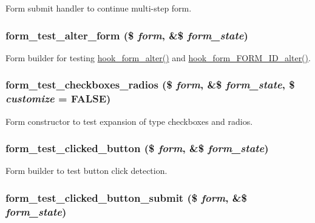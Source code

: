 \label{form__test_8module_a14e1121d5bdf2a79e3547f4d30d410b7}
Form submit handler to continue multi-\/step form. \hypertarget{form__test_8module_a8f29d88f476cd4a4d7770cb83f5b9e5e}{
\subsubsection[{form\_\-test\_\-alter\_\-form}]{\setlength{\rightskip}{0pt plus 5cm}form\_\-test\_\-alter\_\-form (\$ {\em form}, \/  \&\$ {\em form\_\-state})}}
\label{form__test_8module_a8f29d88f476cd4a4d7770cb83f5b9e5e}
Form builder for testing \hyperlink{group__hooks_ga6df3cea27ae1407aeef4eae5444cb213}{hook\_\-form\_\-alter()} and \hyperlink{group__hooks_ga8d4a4089551493d55911bd5c4f218264}{hook\_\-form\_\-FORM\_\-ID\_\-alter()}. \hypertarget{form__test_8module_a2a93627a22f1712c09b118df96838d2c}{
\subsubsection[{form\_\-test\_\-checkboxes\_\-radios}]{\setlength{\rightskip}{0pt plus 5cm}form\_\-test\_\-checkboxes\_\-radios (\$ {\em form}, \/  \&\$ {\em form\_\-state}, \/  \$ {\em customize} = {\ttfamily FALSE})}}
\label{form__test_8module_a2a93627a22f1712c09b118df96838d2c}
Form constructor to test expansion of type checkboxes and radios. \hypertarget{form__test_8module_abd0f05e7f6231b50394fab3668290438}{
\subsubsection[{form\_\-test\_\-clicked\_\-button}]{\setlength{\rightskip}{0pt plus 5cm}form\_\-test\_\-clicked\_\-button (\$ {\em form}, \/  \&\$ {\em form\_\-state})}}
\label{form__test_8module_abd0f05e7f6231b50394fab3668290438}
Form builder to test button click detection. \hypertarget{form__test_8module_aa388c64a1f253abfc751941581b5ce1d}{
\subsubsection[{form\_\-test\_\-clicked\_\-button\_\-submit}]{\setlength{\rightskip}{0pt plus 5cm}form\_\-test\_\-clicked\_\-button\_\-submit (\$ {\em form}, \/  \&\$ {\em form\_\-state})}}
